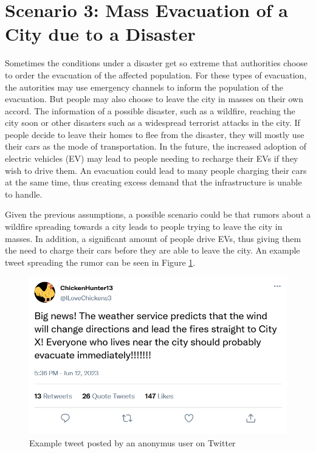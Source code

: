 \section{Scenario 3: Mass Evacuation of a City due to a Disaster}

Sometimes the conditions under a disaster get so extreme that 
authorities choose to order the evacuation of the affected population.
For these types of evacuation, the autorities may use emergency channels 
to inform the population of the evacuation.
But people may also choose to leave the city in masses on their own accord.
The information of a possible disaster, such as a wildfire, reaching the
city soon or other disasters such as a widespread terrorist attacks 
in the city.
If people decide to leave their homes to flee from the disaster, they 
will mostly use their cars as the mode of transportation.
In the future, the increased adoption of electric vehicles (EV)
may lead to people needing to recharge their EVs if they wish 
to drive them. An evacuation could lead to many people charging
their cars at the same time, thus creating excess demand that 
the infrastructure is unable to handle. 

Given the previous assumptions, a possible scenario could be that 
rumors about a wildfire spreading towards a city leads to people
trying to leave the city in masses. In addition, a significant 
amount of people drive EVs, thus giving them the need to charge
their cars before they are able to leave the city. An example
tweet spreading the rumor can be seen in Figure \ref{firetweet}.


\begin{figure}[!ht]
    \center
    \includegraphics[scale=.4]{figs/firenews.png}
    \caption{Example tweet posted by an anonymus user on Twitter}
    \label{firetweet}
\end{figure}

